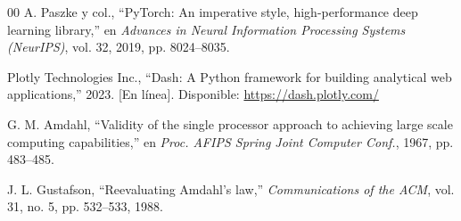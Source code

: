 \begin{thebibliography}{00}
A. Paszke y col., ``PyTorch: An imperative style, high-performance deep learning library,'' en \textit{Advances in Neural Information Processing Systems (NeurIPS)}, vol. 32, 2019, pp. 8024--8035.

Plotly Technologies Inc., ``Dash: A Python framework for building analytical web applications,'' 2023. [En línea]. Disponible: \url{https://dash.plotly.com/}

G. M. Amdahl, ``Validity of the single processor approach to achieving large scale computing capabilities,'' en \textit{Proc. AFIPS Spring Joint Computer Conf.}, 1967, pp. 483--485.

J. L. Gustafson, ``Reevaluating Amdahl's law,'' \textit{Communications of the ACM}, vol. 31, no. 5, pp. 532--533, 1988.

\end{thebibliography}


